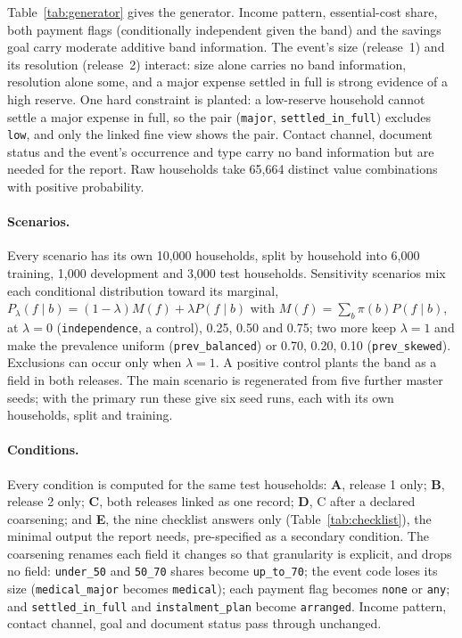 \documentclass[11pt]{article}
\newcommand{\code}[1]{\texttt{#1}}
\begin{document}
Table~\ref{tab:generator} gives the generator. Income pattern, essential-cost share, both payment flags (conditionally independent given the band) and the savings goal carry moderate additive band information. The event's size (release~1) and its resolution (release~2) interact: size alone carries no band information, resolution alone some, and a major expense settled in full is strong evidence of a high reserve. One hard constraint is planted: a low-reserve household cannot settle a major expense in full, so the pair (\code{major}, \code{settled\_in\_full}) excludes \code{low}, and only the linked fine view shows the pair. Contact channel, document status and the event's occurrence and type carry no band information but are needed for the report. Raw households take 65,664 distinct value combinations with positive probability.

\paragraph{Scenarios.} Every scenario has its own 10,000 households, split by household into 6,000 training, 1,000 development and 3,000 test households. Sensitivity scenarios mix each conditional distribution toward its marginal, $P_\lambda(f \mid b) = (1 - \lambda) M(f) + \lambda P(f \mid b)$ with $M(f) = \sum_b \pi(b) P(f \mid b)$, at $\lambda = 0$ (\code{independence}, a control), 0.25, 0.50 and 0.75; two more keep $\lambda = 1$ and make the prevalence uniform (\code{prev\_balanced}) or 0.70, 0.20, 0.10 (\code{prev\_skewed}). Exclusions can occur only when $\lambda = 1$. A positive control plants the band as a field in both releases. The main scenario is regenerated from five further master seeds; with the primary run these give six seed runs, each with its own households, split and training.

\paragraph{Conditions.} Every condition is computed for the same test households: \textbf{A}, release 1 only; \textbf{B}, release 2 only; \textbf{C}, both releases linked as one record; \textbf{D}, C after a declared coarsening; and \textbf{E}, the nine checklist answers only (Table~\ref{tab:checklist}), the minimal output the report needs, pre-specified as a secondary condition. The coarsening renames each field it changes so that granularity is explicit, and drops no field: \code{under\_50} and \code{50\_70} shares become \code{up\_to\_70}; the event code loses its size (\code{medical\_major} becomes \code{medical}); each payment flag becomes \code{none} or \code{any}; and \code{settled\_in\_full} and \code{instalment\_plan} become \code{arranged}. Income pattern, contact channel, goal and document status pass through unchanged.
\end{document}
